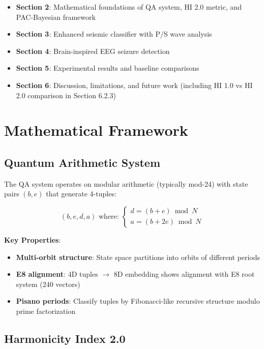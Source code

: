 \documentclass[11pt]{article}
\theoremstyle{remark}
\begin{document}
\begin{itemize}
\item \textbf{Section 2}: Mathematical foundations of QA system, HI 2.0 metric, and PAC-Bayesian framework
\item \textbf{Section 3}: Enhanced seismic classifier with P/S wave analysis
\item \textbf{Section 4}: Brain-inspired EEG seizure detection
\item \textbf{Section 5}: Experimental results and baseline comparisons
\item \textbf{Section 6}: Discussion, limitations, and future work (including HI 1.0 vs HI 2.0 comparison in Section 6.2.3)
\end{itemize}

\section{Mathematical Framework}

\subsection{Quantum Arithmetic System}

The QA system operates on modular arithmetic (typically mod-24) with state pairs $(b, e)$ that generate 4-tuples:

\begin{equation}
(b, e, d, a) \text{ where: }
\begin{cases}
d = (b + e) \bmod N \\
a = (b + 2e) \bmod N
\end{cases}
\end{equation}

\textbf{Key Properties}:
\begin{itemize}
\item \textbf{Multi-orbit structure}: State space partitions into orbits of different periods
\item \textbf{E8 alignment}: 4D tuples $\to$ 8D embedding shows alignment with E8 root system (240 vectors)
\item \textbf{Pisano periods}: Classify tuples by Fibonacci-like recursive structure modulo prime factorization
\end{itemize}

\subsection{Harmonicity Index 2.0}
\end{document}

